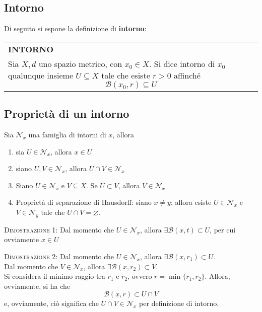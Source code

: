 \documentclass[a4paper]{extarticle}
\renewcommand\arraystretch{}
\begin{document}
\vspace{1em}
\subsection{Intorno}
Di seguito si espone la definizione di \textbf{intorno}:

\vspace{1em}
\setlength{\tabcolsep}{14pt}
\renewcommand{\arraystretch}{2}
\noindent
\begin{tabularx}{\textwidth}{@{}|P|@{}}
    \hline
    {\textbf{INTORNO}}\\
    \parbox{\linewidth}{Sia $X,d$ uno spazio metrico, con $x_0 \in X$. Si dice intorno di $x_0$ qualunque insieme $U \subseteq X$ tale che esiste $r>0$ affinché
    \[\mathcal{B}(x_0,r) \subseteq U\]
    \vspace{3mm}}\\
    \hline
\end{tabularx}

\vspace{1em}
\subsection{Proprietà di un intorno}
Sia $\mathcal{N}_x$ una famiglia di intorni di $x$, allora
\begin{enumerate}
    \item sia $U \in \mathcal{N}_x$, allora $x \in U$
    \item siano $U,V \in \mathcal{N}_x$, allora $U \cap V \in \mathcal{N}_x$
    \item Siano $U \in \mathcal{N}_x$ e $V \subseteq X$. Se $U \subset V$, allora $V \in \mathcal{N}_x$
    \item Proprietà di separazione di Hausdorff: siano $x \neq y$; allora esiste $U \in \mathcal{N}_x$ e $V \in \mathcal{N}_y$ tale che $U \cap V = \varnothing$.
\end{enumerate}

\vspace{2em}
\noindent
\normalfont \normalsize
\textsc{Dimostrazione 1}: Dal momento che $U \in \mathcal{N}_x$, allora $\exists \mathcal{B}(x,t) \subset U$, per cui ovviamente $x \in U$

\vspace{2em}
\noindent
\normalfont \normalsize
\textsc{Dimostrazione 2}: Dal momento che $U \in \mathcal{N}_x$, allora $\exists \mathcal{B}(x,r_1) \subset U$.\\
Dal momento che $V \in \mathcal{N}_x$, allora $\exists \mathcal{B}(x,r_2) \subset V$.\\
Si considera il minimo raggio tra $r_1$ e $r_2$, ovvero $r=\min\{r_1,r_2\}$. Allora, ovviamente, si ha che
\[\mathcal{B}(x,r) \subset U \cap V\]
e, ovviamente, ciò significa che $U \cap V \in \mathcal{N}_x$ per definizione di intorno.
\end{document}
